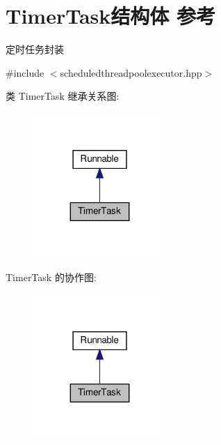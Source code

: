 \hypertarget{structTimerTask}{}\section{Timer\+Task结构体 参考}
\label{structTimerTask}


定时任务封装  




{\ttfamily \#include $<$scheduledthreadpoolexecutor.\+hpp$>$}



类 Timer\+Task 继承关系图\+:\nopagebreak
\begin{figure}[H]
\begin{center}
\leavevmode
\includegraphics[width=143pt]{structTimerTask__inherit__graph}
\end{center}
\end{figure}


Timer\+Task 的协作图\+:\nopagebreak
\begin{figure}[H]
\begin{center}
\leavevmode
\includegraphics[width=143pt]{structTimerTask__coll__graph}
\end{center}
\end{figure}
